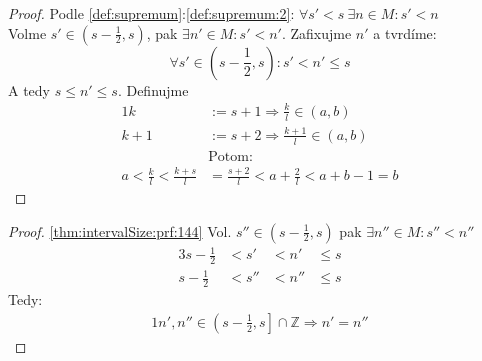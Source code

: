 \begin{proof}
	Podle \autoref*{def:supremum}:\autoref{def:supremum:2}: $\forall s'<s~\exists n\in M:s'<n$ \\
	Volme $s'\in\left(s-\frac{1}{2},s\right)$, pak $\exists n'\in M: s'<n'$.
	Zafixujme $n'$ a tvrdíme:
	\begin{equation}\label{thm:intervalSize:prf:144}
		\forall s'\in (s-\frac{1}{2},s): s'<n'\leq s
	\end{equation}
	A tedy $s\leq n'\leq s$. Definujme
	\begin{alignat}{1}
		k&:=s+1 \Rightarrow \frac{k}{l}\in (a,b) \\
		k+1&:=s+2 \Rightarrow \frac{k+1}{l}\in (a,b) \\
		&\text{Potom:} \nonumber\\
		a<\frac{k}{l}<\frac{k+s}{l}&=\frac{s+2}{l}<a+\frac{2}{l}<a+b-1=b  %
	\end{alignat}
\end{proof}

\begin{proof}
	\autoref{thm:intervalSize:prf:144} Vol. $s''\in (s-\frac{1}{2},s)$ pak $\exists n''\in M: s''<n''$
	\begin{alignat}{3}
		s-\frac{1}{2}&<s'&<n'&\leq s \\
		s-\frac{1}{2}&<s''&<n''&\leq s
	\end{alignat}
	Tedy:
	\begin{alignat}{1}
		n',n'' \in \left(s-\frac{1}{2},s\right]\cap\mathbb{Z}\Rightarrow n'=n''
	\end{alignat}
\end{proof}
